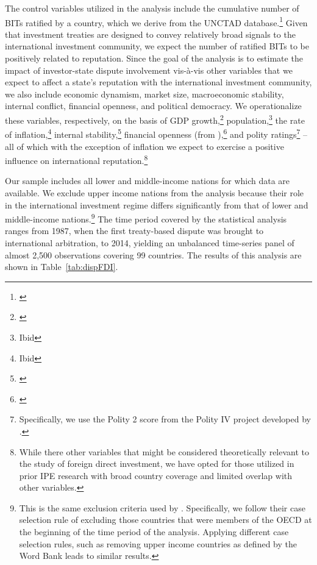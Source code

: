 \documentclass[12pt,onesided]{amsart}
\begin{document}
The control variables utilized in the analysis include the cumulative number of BITs ratified by a country, which we derive from the UNCTAD database.\footnote{\citet{unctad:2013c}} Given that investment treaties are designed to convey relatively broad signals to the international investment community, we expect the number of ratified BITs to be positively related to reputation. Since the goal of the analysis is to estimate the impact of investor-state dispute involvement vis-\`{a}-vis other variables that we expect to affect a state's reputation with the international investment community, we also include economic dynamism, market size, macroeconomic stability, internal conflict, financial openness, and political democracy. We operationalize these variables, respectively, on the basis of GDP growth,\footnote{\citet{worldbank:2013}} population,\footnote{Ibid} the rate of inflation,\footnote{Ibid} internal stability,\footnote{\citet{prs:2013}} financial openness (from \citeauthor{chinn:ito:2008}),\footnote{\citet{chinn:ito:2008}} and polity ratings\footnote{Specifically, we use the Polity 2 score from the Polity IV project developed by \citet{marshall2013polity}.} -- all of which with the exception of inflation we expect to exercise a positive influence on international reputation.\footnote{While there other variables that might be considered theoretically relevant to the study of foreign direct investment, we have opted for those utilized in prior IPE research with broad country coverage and limited overlap with other variables.}

Our sample includes all lower and middle-income nations for which data are available. We exclude upper income nations from the analysis because their role in the international investment regime differs significantly from that of lower and middle-income nations.\footnote{This is the same exclusion criteria used by \citet{allee:peinhardt:2011}. Specifically, we follow their case selection rule of excluding those countries that were members of the OECD at the beginning of the time period of the analysis. Applying different case selection rules, such as removing upper income countries as defined by the Word Bank leads to similar results.} The time period covered by the statistical analysis ranges from 1987, when the first treaty-based dispute was brought to international arbitration, to 2014, yielding an unbalanced time-series panel of almost 2,500 observations covering 99 countries. The results of this analysis are shown in Table~\ref{tab:dispFDI}.

\end{document}
